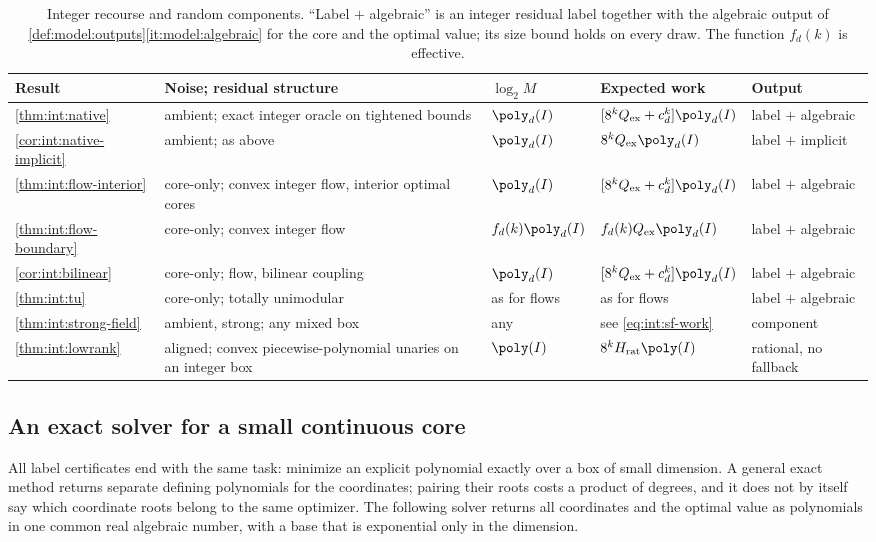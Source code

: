 \begin{table}[t]
\centering
\caption{Integer recourse and random components. ``Label $+$ algebraic'' is
an integer residual label together with the algebraic output of
\cref{def:model:outputs}\ref{it:model:algebraic} for the core and the optimal
value; its size bound holds on every draw. The function $f_d(k)$ is
effective.}
\label{tab:int:summary}
\small
\begin{tabularx}{\textwidth}{@{}lXlll@{}}
\toprule
Result & Noise; residual structure & $\log_2M$ & Expected work & Output\\
\midrule
\cref{thm:int:native} & ambient; exact integer oracle on tightened bounds
& $\poly_d(I)$ & $[8^kQ_{\rm ex}+c_d^k]\poly_d(I)$ & label $+$ algebraic\\
\cref{cor:int:native-implicit} & ambient; as above & $\poly_d(I)$
& $8^kQ_{\rm ex}\poly_d(I)$ & label $+$ implicit\\
\cref{thm:int:flow-interior} & core-only; convex integer flow, interior
optimal cores & $\poly_d(I)$ & $[8^kQ_{\rm ex}+c_d^k]\poly_d(I)$
& label $+$ algebraic\\
\cref{thm:int:flow-boundary} & core-only; convex integer flow
& $f_d(k)\poly_d(I)$ & $f_d(k)Q_{\rm ex}\poly_d(I)$ & label $+$ algebraic\\
\cref{cor:int:bilinear} & core-only; flow, bilinear coupling & $\poly_d(I)$
& $[8^kQ_{\rm ex}+c_d^k]\poly_d(I)$ & label $+$ algebraic\\
\cref{thm:int:tu} & core-only; totally unimodular & as for flows
& as for flows & label $+$ algebraic\\
\cref{thm:int:strong-field} & ambient, strong; any mixed box & any
& see \eqref{eq:int:sf-work} & component\\
\cref{thm:int:lowrank} & aligned; convex piecewise-polynomial unaries on an
integer box & $\poly(I)$ & $8^kH_{\rm rat}\poly(I)$ & rational, no fallback\\
\bottomrule
\end{tabularx}
\end{table}

\subsection{An exact solver for a small continuous core}\label{sec:int:solver}

All label certificates end with the same task: minimize an explicit
polynomial exactly over a box of small dimension. A general exact method
returns separate defining polynomials for the coordinates; pairing their
roots costs a product of degrees, and it does not by itself say which
coordinate roots belong to the same optimizer. The following solver returns
all coordinates and the optimal value as polynomials in one common real
algebraic number, with a base that is exponential only in the dimension.

